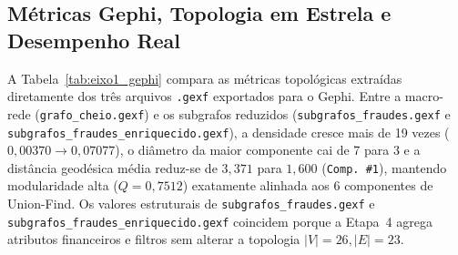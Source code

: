 \subsection{Métricas Gephi, Topologia em Estrela e Desempenho Real}

A Tabela~\ref{tab:eixo1_gephi} compara as métricas topológicas extraídas diretamente dos três arquivos \texttt{.gexf} exportados para o Gephi. Entre a macro-rede (\texttt{grafo\_\allowbreak cheio.gexf}) e os subgrafos reduzidos (\texttt{subgrafos\_\allowbreak fraudes.gexf} e \texttt{subgrafos\_\allowbreak fraudes\_\allowbreak enriquecido.gexf}), a densidade cresce mais de 19 vezes ($0{,}00370 \to 0{,}07077$), o diâmetro da maior componente cai de 7 para 3 e a distância geodésica média reduz-se de $3{,}371$ para $1{,}600$ (\texttt{Comp.~\#1}), mantendo modularidade alta ($Q=0{,}7512$) exatamente alinhada aos 6 componentes de Union-Find. Os valores estruturais de \texttt{subgrafos\_\allowbreak fraudes.gexf} e \texttt{subgrafos\_\allowbreak fraudes\_\allowbreak enriquecido.gexf} coincidem porque a Etapa~4 agrega atributos financeiros e filtros sem alterar a topologia $|V|=26, |E|=23$.

\begin{table}[!t]
\centering
\caption{Tempos reais cronometrados por etapa de \textnormal{\texttt{01\_\allowbreak analise\_\allowbreak socios}} (cache local de 673 CNPJs).}
\label{tab:eixo1_benchmark}
\par{}
\end{table}

